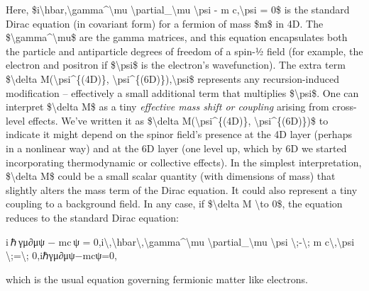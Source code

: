 \documentclass[
]{article}
\begin{document}
Here, \$i\textbackslash hbar,\textbackslash gamma\^{}\textbackslash mu
\textbackslash partial\_\textbackslash mu \textbackslash psi - m
c,\textbackslash psi = 0\$ is the standard Dirac equation (in covariant
form) for a fermion of mass \$m\$ in 4D. The
\$\textbackslash gamma\^{}\textbackslash mu\$ are the gamma matrices,
and this equation encapsulates both the particle and antiparticle
degrees of freedom of a spin-½ field (for example, the electron and
positron if \$\textbackslash psi\$ is the electron's wavefunction). The
extra term \$\textbackslash delta M(\textbackslash psi\^{}\{(4D)\},
\textbackslash psi\^{}\{(6D)\}),\textbackslash psi\$ represents any
recursion-induced modification -- effectively a small additional term
that multiplies \$\textbackslash psi\$. One can interpret
\$\textbackslash delta M\$ as a tiny \emph{effective mass shift or
coupling} arising from cross-level effects. We've written it as
\$\textbackslash delta M(\textbackslash psi\^{}\{(4D)\},
\textbackslash psi\^{}\{(6D)\})\$ to indicate it might depend on the
spinor field's presence at the 4D layer (perhaps in a nonlinear way) and
at the 6D layer (one level up, which by 6D we started incorporating
thermodynamic or collective effects). In the simplest interpretation,
\$\textbackslash delta M\$ could be a small scalar quantity (with
dimensions of mass) that slightly alters the mass term of the Dirac
equation. It could also represent a tiny coupling to a background field.
In any case, if \$\textbackslash delta M \textbackslash to 0\$, the
equation reduces to the standard Dirac equation:

i ℏ γμ∂μψ  −  mc ψ  =  0,i\textbackslash,\textbackslash hbar\textbackslash,\textbackslash gamma\^{}\textbackslash mu
\textbackslash partial\_\textbackslash mu \textbackslash psi
\textbackslash;-\textbackslash; m c\textbackslash,\textbackslash psi
\textbackslash;=\textbackslash; 0,iℏγμ∂μ\hspace{0pt}ψ−mcψ=0,

which is the usual equation governing fermionic matter like electrons.
\end{document}
